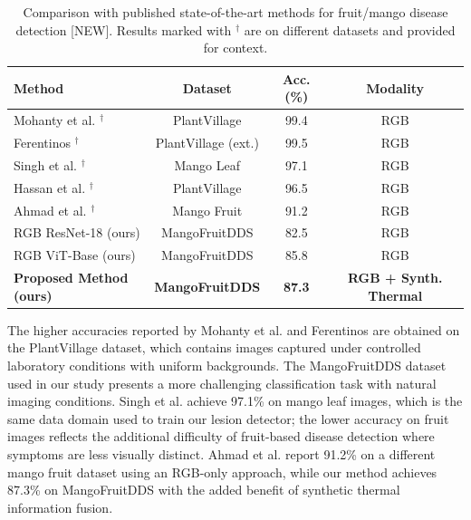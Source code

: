 \documentclass[utf8]{FrontiersinHarvard}
\newenvironment{revblock}{}{}
\begin{document}
\begin{table}[h!]
    \caption{Comparison with published state-of-the-art methods for fruit/mango disease detection [NEW]. Results marked with $^{\dagger}$ are on different datasets and provided for context.}
    \label{tab:sota}
    \raggedright
    \scriptsize
    \begin{tabular}{lccc}
        \toprule
        \textbf{Method} & \textbf{Dataset} & \textbf{Acc. (\%)} & \textbf{Modality} \\
        \midrule
        Mohanty et al. \cite{mohanty2016}$^{\dagger}$ & PlantVillage & 99.4 & RGB \\
        Ferentinos \cite{ferentinos2018}$^{\dagger}$ & PlantVillage (ext.) & 99.5 & RGB \\
        Singh et al. \cite{singh2019}$^{\dagger}$ & Mango Leaf & 97.1 & RGB \\
        Hassan et al. \cite{hassan2021}$^{\dagger}$ & PlantVillage & 96.5 & RGB \\
        Ahmad et al. \cite{ahmad2023}$^{\dagger}$ & Mango Fruit & 91.2 & RGB \\
        \midrule
        RGB ResNet-18 (ours) & MangoFruitDDS & 82.5 & RGB \\
        RGB ViT-Base (ours) & MangoFruitDDS & 85.8 & RGB \\
        \textbf{Proposed Method (ours)} & \textbf{MangoFruitDDS} & \textbf{87.3} & \textbf{RGB + Synth. Thermal} \\
        \bottomrule
    \end{tabular}
\end{table}

\begin{revblock}
The higher accuracies reported by Mohanty et al. \cite{mohanty2016} and Ferentinos \cite{ferentinos2018} are obtained on the PlantVillage dataset, which contains images captured under controlled laboratory conditions with uniform backgrounds. The MangoFruitDDS dataset used in our study presents a more challenging classification task with natural imaging conditions. Singh et al. \cite{singh2019} achieve 97.1\% on mango leaf images, which is the same data domain used to train our lesion detector; the lower accuracy on fruit images reflects the additional difficulty of fruit-based disease detection where symptoms are less visually distinct. Ahmad et al. \cite{ahmad2023} report 91.2\% on a different mango fruit dataset using an RGB-only approach, while our method achieves 87.3\% on MangoFruitDDS with the added benefit of synthetic thermal information fusion.
\end{revblock}
\end{document}
